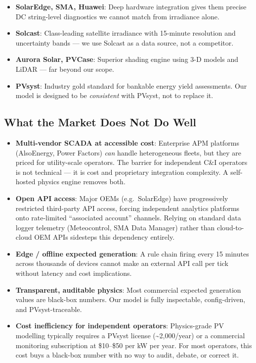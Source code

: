 \documentclass[11pt, a4paper]{article}
\begin{document}
\begin{itemize}
  \item \textbf{SolarEdge, SMA, Huawei}: Deep hardware integration gives them
    precise DC string-level diagnostics we cannot match from irradiance alone.
  \item \textbf{Solcast}: Class-leading satellite irradiance with 15-minute
    resolution and uncertainty bands --- we use Solcast as a data source, not a
    competitor.
  \item \textbf{Aurora Solar, PVCase}: Superior shading engine using 3-D models
    and LiDAR --- far beyond our scope.
  \item \textbf{PVsyst}: Industry gold standard for bankable energy yield
    assessments. Our model is designed to be \emph{consistent} with PVsyst,
    not to replace it.
\end{itemize}

\subsection{What the Market Does Not Do Well}

\begin{itemize}
  \item \textbf{Multi-vendor SCADA at accessible cost}: Enterprise APM platforms
    (AlsoEnergy, Power Factors) \emph{can} handle heterogeneous fleets, but
    they are priced for utility-scale operators. The barrier for independent
    C\&I operators is not technical --- it is cost and proprietary integration
    complexity. A self-hosted physics engine removes both.
  \item \textbf{Open API access}: Major OEMs (e.g.\ SolarEdge) have
    progressively restricted third-party API access, forcing independent
    analytics platforms onto rate-limited ``associated account'' channels.
    Relying on standard data logger telemetry (Meteocontrol, SMA Data Manager)
    rather than cloud-to-cloud OEM APIs sidesteps this dependency entirely.
  \item \textbf{Edge / offline expected generation}: A rule chain firing
    every 15 minutes across thousands of devices cannot make an external
    API call per tick without latency and cost implications.
  \item \textbf{Transparent, auditable physics}: Most commercial expected
    generation values are black-box numbers. Our model is fully inspectable,
    config-driven, and PVsyst-traceable.
  \item \textbf{Cost inefficiency for independent operators}: Physics-grade
    PV modelling typically requires a PVsyst license
    (\textasciitilde\EUR{}2{,}000/year) or a commercial monitoring
    subscription at \$10--\$50 per kW per year. For most operators, this
    cost buys a black-box number with no way to audit, debate, or correct it.
\end{itemize}
\end{document}
